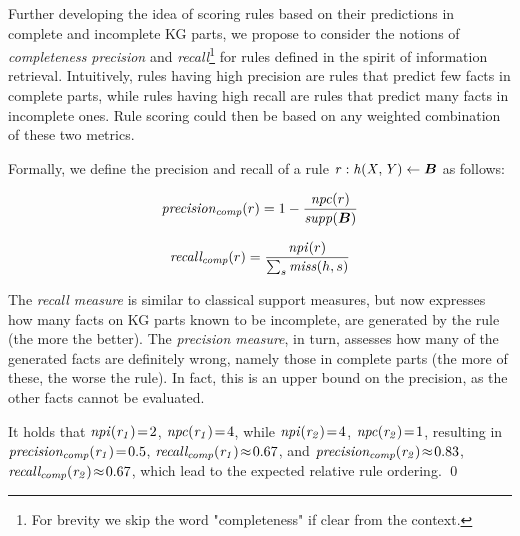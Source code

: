 
Further developing the idea of scoring rules based on their predictions in complete and incomplete KG parts, we propose to consider the notions of  \emph{completeness precision} and \emph{recall}\footnote{For brevity we skip the word "completeness" if clear from the context.} for rules defined in the spirit of information retrieval. Intuitively, rules having high precision are rules that predict few facts in complete parts, while rules having high recall are rules that predict many facts in incomplete ones. Rule scoring could then be based on any weighted combination of these two metrics.

Formally, we define the precision and recall of a rule $\mi{r: h(X,Y)\leftarrow \vec{B}}$ as follows:

\begin{equation}\label{eq:precision}
\mi{precision_{comp}}(r)=1-\frac{\mi{npc}(r)}{\mi{supp}(\vec{B})}
\end{equation}

\begin{equation}\label{eq:recall}
\mathit{recall_{comp}}(r)=\frac{\mathit{npi}(r)}{\sum_s \mathit{miss}(h,s)}
\end{equation}

The \emph{recall measure} is similar to classical support measures, but now expresses how many facts on KG parts known to be incomplete, are generated by the rule (the more the better). The \emph{precision measure}, in turn, assesses how many of the generated facts are definitely wrong, namely those in complete parts (the more of these, the worse the rule). In fact, this is an upper bound on the precision, as the other facts cannot be evaluated.

\begin{example}
\label{ex:prec_recall}
It holds that $\mathit{npi(r_1)}\!=\!2$, %
$\mathit{npc(r_1)}\!=\!4$, %
while $\mathit{npi(r_2)}\!=\!4$, $\mathit{npc(r_2)}\!=\!1$, resulting in $\mathit{precision_{comp}(r_1)}\!=\!0.5$, 
$\mathit{recall_{comp}(r_1)}\!\approx\!0.67$, %
and $\mathit{precision_{comp}(r_2)}\!\approx\!0.83$, $\mathit{recall_{comp}(r_2)}\!\approx\!0.67$, which lead to the expected relative rule ordering. \qed
\end{example}

